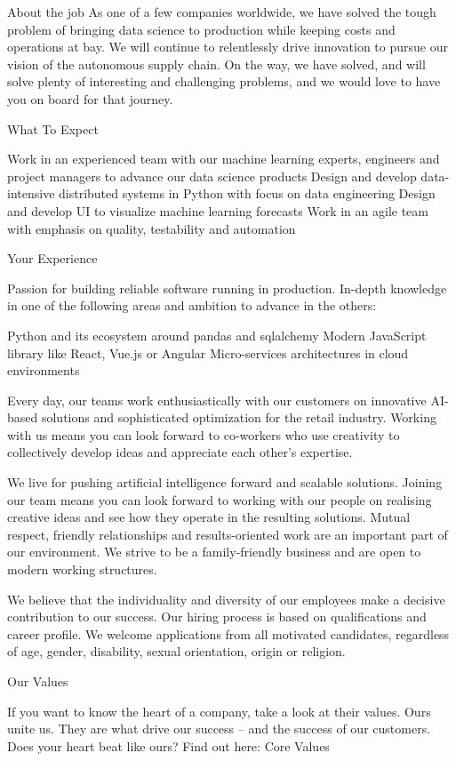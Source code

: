 About the job
As one of a few companies worldwide, we have solved the tough problem of bringing data science to production while keeping costs and operations at bay. We will continue to relentlessly drive innovation to pursue our vision of the autonomous supply chain. On the way, we have solved, and will solve plenty of interesting and challenging problems, and we would love to have you on board for that journey.

What To Expect

Work in an experienced team with our machine learning experts, engineers and project managers to advance our data science products
Design and develop data-intensive distributed systems in Python with focus on data engineering
Design and develop UI to visualize machine learning forecasts
Work in an agile team with emphasis on quality, testability and automation

Your Experience

Passion for building reliable software running in production. In-depth knowledge in one of the following areas and ambition to advance in the others:

Python and its ecosystem around pandas and sqlalchemy
Modern JavaScript library like React, Vue.js or Angular
Micro-services architectures in cloud environments

Every day, our teams work enthusiastically with our customers on innovative AI-based solutions and sophisticated optimization for the retail industry. Working with us means you can look forward to co-workers who use creativity to collectively develop ideas and appreciate each other’s expertise.

We live for pushing artificial intelligence forward and scalable solutions. Joining our team means you can look forward to working with our people on realising creative ideas and see how they operate in the resulting solutions. Mutual respect, friendly relationships and results-oriented work are an important part of our environment. We strive to be a family-friendly business and are open to modern working structures.

We believe that the individuality and diversity of our employees make a decisive contribution to our success. Our hiring process is based on qualifications and career profile. We welcome applications from all motivated candidates, regardless of age, gender, disability, sexual orientation, origin or religion.

Our Values

If you want to know the heart of a company, take a look at their values. Ours unite us. They are what drive our success – and the success of our customers. Does your heart beat like ours? Find out here: Core Values